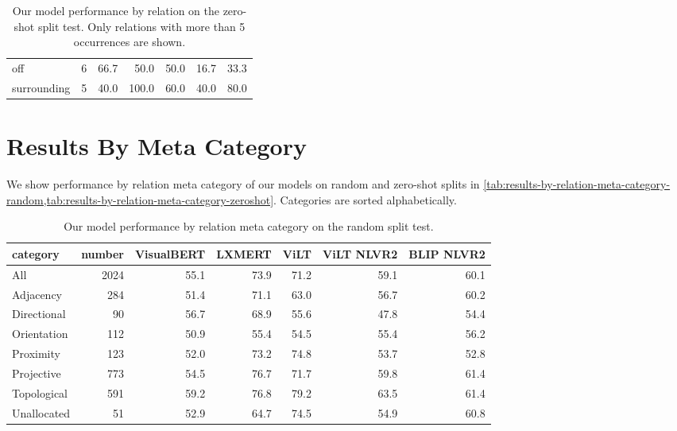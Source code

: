 \begin{table}[ht]
\begin{adjustbox}{max width=0.7\textwidth}
\begin{tabular}{lrrrrrr}
off                  &       6 &        66.7 &    50.0 &  50.0 &        16.7 &        33.3 \\
surrounding          &       5 &        40.0 &   100.0 &  60.0 &        40.0 &        80.0 \\
\bottomrule
\end{tabular}
\end{adjustbox}
\caption{Our model performance by relation on the zero-shot split test. Only relations with more than 5 occurrences are shown.}
\label{tab:results-by-relation-zeroshot}
\end{table}

\section{Results By Meta Category} \label{vsr_results_meta_tables}

We show performance by relation meta category of our models on random and zero-shot splits in \cref{tab:results-by-relation-meta-category-random,tab:results-by-relation-meta-category-zeroshot}. Categories are sorted alphabetically.

\begin{table}[ht]
\centering
\begin{adjustbox}{max width=0.7\textwidth}
\begin{tabular}{lrrrrrr}
\toprule
category &  number &  VisualBERT &  LXMERT &  ViLT &  ViLT NLVR2 &  BLIP NLVR2 \\
\midrule
All         &    2024 &        55.1 &    73.9 &  71.2 &        59.1 &        60.1 \\
\midrule
Adjacency   &     284 &        51.4 &    71.1 &  63.0 &        56.7 &        60.2 \\
Directional &      90 &        56.7 &    68.9 &  55.6 &        47.8 &        54.4 \\
Orientation &     112 &        50.9 &    55.4 &  54.5 &        55.4 &        56.2 \\
Proximity   &     123 &        52.0 &    73.2 &  74.8 &        53.7 &        52.8 \\
Projective  &     773 &        54.5 &    76.7 &  71.7 &        59.8 &        61.4 \\
Topological &     591 &        59.2 &    76.8 &  79.2 &        63.5 &        61.4 \\
Unallocated &      51 &        52.9 &    64.7 &  74.5 &        54.9 &        60.8 \\
\bottomrule
\end{tabular}
\end{adjustbox}
\caption{Our model performance by relation meta category on the random split test.}
\label{tab:results-by-relation-meta-category-random}
\end{table}

